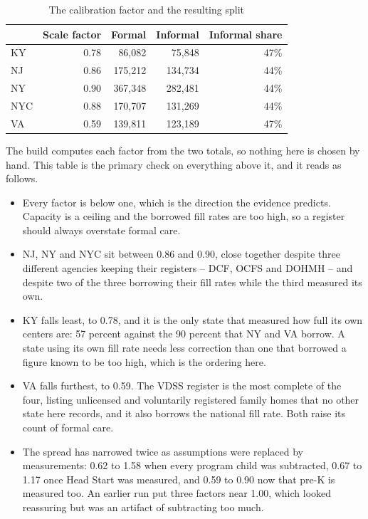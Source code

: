 \documentclass[11pt]{article}
\begin{document}
\begin{table}[H]
\centering
\caption{The calibration factor and the resulting split}
\begin{tabular}{L{1.6cm}rrrr}
\toprule
& \textbf{Scale factor} & \textbf{Formal} & \textbf{Informal} & \textbf{Informal share} \\
\midrule
KY  & 0.78 &  86,082 &  75,848 & 47\% \\
NJ  & 0.86 & 175,212 & 134,734 & 44\% \\
NY  & 0.90 & 367,348 & 282,481 & 44\% \\
NYC & 0.88 & 170,707 & 131,269 & 44\% \\
VA  & 0.59 & 139,811 & 123,189 & 47\% \\
\bottomrule
\end{tabular}
\end{table}

The build computes each factor from the two totals, so nothing here is chosen by
hand. This table is the primary check on everything above it, and it reads as
follows.

\begin{itemize}
\setlength{\itemsep}{0.45em}
\item Every factor is below one, which is the direction the evidence predicts.
      Capacity is a ceiling and the borrowed fill rates are too high, so a
      register should always overstate formal care.
\item NJ, NY and NYC sit between 0.86 and 0.90, close together despite three
      different agencies keeping their registers -- DCF, OCFS and DOHMH -- and
      despite two of the three borrowing their fill rates while the third
      measured its own.
\item KY falls least, to 0.78, and it is the only state that measured how full
      its own centers are: 57 percent against the 90 percent that NY and VA
      borrow. A state using its own fill rate needs less correction than one
      that borrowed a figure known to be too high, which is the ordering here.
\item VA falls furthest, to 0.59. The VDSS register is the most complete of the
      four, listing unlicensed and voluntarily registered family homes that no
      other state here records, and it also borrows the national fill rate. Both raise its count of
      formal care.
\item The spread has narrowed twice as assumptions were replaced by
      measurements: 0.62 to 1.58 when every program child was subtracted, 0.67
      to 1.17 once Head Start was measured, and 0.59 to 0.90 now that pre-K is
      measured too. An earlier run put three factors near 1.00, which looked
      reassuring but was an artifact of subtracting too much.
\end{itemize}
\end{document}
